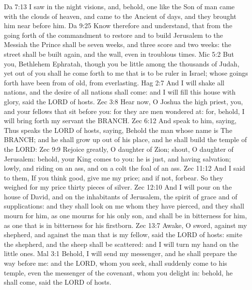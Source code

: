 Da 7:13  I saw in the night visions, and, behold, one like the Son of man came with the clouds of heaven, and came to the Ancient of days, and they brought him near before him.
Da 9:25  Know therefore and understand, that from the going forth of the commandment to restore and to build Jerusalem to the Messiah the Prince shall be seven weeks, and three score and two weeks: the street shall be built again, and the wall, even in troublous times.
Mic 5:2  But you, Bethlehem Ephratah, though you be little among the thousands of Judah, yet out of you shall he come forth to me that is to be ruler in Israel; whose goings forth have been from of old, from everlasting.
Hag 2:7  And I will shake all nations, and the desire of all nations shall come: and I will fill this house with glory, said the LORD of hosts.
Zec 3:8  Hear now, O Joshua the high priest, you, and your fellows that sit before you: for they are men wondered at: for, behold, I will bring forth my servant the BRANCH.
Zec 6:12  And speak to him, saying, Thus speaks the LORD of hosts, saying, Behold the man whose name is The BRANCH; and he shall grow up out of his place, and he shall build the temple of the LORD:
Zec 9:9  Rejoice greatly, O daughter of Zion; shout, O daughter of Jerusalem: behold, your King comes to you: he is just, and having salvation; lowly, and riding on an ass, and on a colt the foal of an ass.
Zec 11:12  And I said to them, If you think good, give me my price; and if not, forbear. So they weighed for my price thirty pieces of silver.
Zec 12:10  And I will pour on the house of David, and on the inhabitants of Jerusalem, the spirit of grace and of supplications: and they shall look on me whom they have pierced, and they shall mourn for him, as one mourns for his only son, and shall be in bitterness for him, as one that is in bitterness for his firstborn.
Zec 13:7  Awake, O sword, against my shepherd, and against the man that is my fellow, said the LORD of hosts: smite the shepherd, and the sheep shall be scattered: and I will turn my hand on the little ones.
Mal 3:1  Behold, I will send my messenger, and he shall prepare the way before me: and the LORD, whom you seek, shall suddenly come to his temple, even the messenger of the covenant, whom you delight in: behold, he shall come, said the LORD of hosts. 